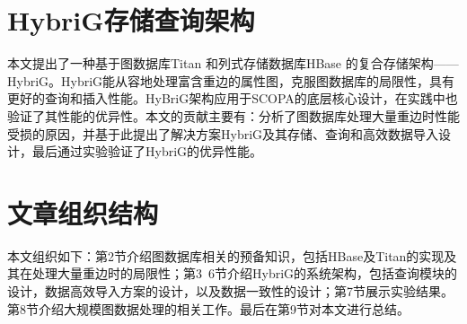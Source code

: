 \section{HybriG存储查询架构}
本文提出了一种基于图数据库Titan 和列式存储数据库HBase 的复合存储架构——HybriG。HybriG能从容地处理富含重边的属性图，克服图数据库的局限性，具有更好的查询和插入性能。HyBriG架构应用于SCOPA的底层核心设计，在实践中也验证了其性能的优异性。本文的贡献主要有：分析了图数据库处理大量重边时性能受损的原因，并基于此提出了解决方案HybriG及其存储、查询和高效数据导入设计，最后通过实验验证了HybriG的优异性能。

\section{文章组织结构}
本文组织如下：第2节介绍图数据库相关的预备知识，包括HBase及Titan的实现及其在处理大量重边时的局限性；第3~6节介绍HybriG的系统架构，包括查询模块的设计，数据高效导入方案的设计，以及数据一致性的设计；第7节展示实验结果。第8节介绍大规模图数据处理的相关工作。最后在第9节对本文进行总结。

